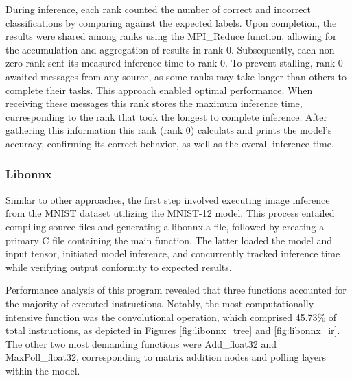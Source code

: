 \documentclass[fleqn,10pt]{olplainarticle}
\begin{document}
During inference, each rank counted the number of correct and incorrect classifications by comparing against the expected labels. Upon completion, the results were shared among ranks using the MPI\_Reduce function, allowing for the accumulation and aggregation of results in rank 0. Subsequently, each non-zero rank sent its measured inference time to rank 0. To prevent stalling, rank 0 awaited messages from any source, as some ranks may take longer than others to complete their tasks. This approach enabled optimal performance. When receiving these messages this rank stores the maximum inference time, curresponding to the rank that took the longest to complete inference. After gathering this information this rank (rank 0) calculats and prints the model's accuracy, confirming its correct behavior, as well as the overall inference time.

\subsubsection{Libonnx}
Similar to other approaches, the first step involved executing image inference from the MNIST dataset utilizing the MNIST-12 model. This process entailed compiling source files and generating a libonnx.a file, followed by creating a primary C file containing the main function. The latter loaded the model and input tensor, initiated model inference, and concurrently tracked inference time while verifying output conformity to expected results.

Performance analysis of this program revealed that three functions accounted for the majority of executed instructions. Notably, the most computationally intensive function was the convolutional operation, which comprised 45.73\% of total instructions, as depicted in Figures \ref{fig:libonnx_tree} and \ref{fig:libonnx_ir}. The other two most demanding functions were Add\_float32 and MaxPoll\_float32, corresponding to matrix addition nodes and polling layers within the model.
\end{document}
